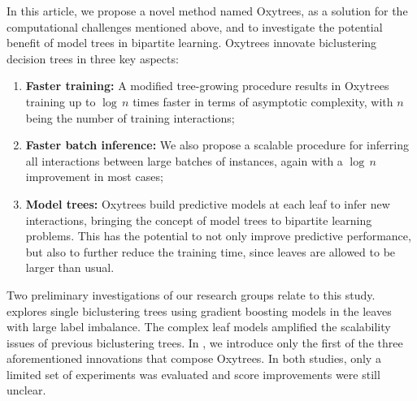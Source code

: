 \documentclass[sn-mathphys-num]{sn-jnl}%
\theoremstyle{thmstyleone}%
\theoremstyle{thmstyletwo}%
\theoremstyle{thmstylethree}%
\begin{document}
In this article, we propose a novel method named Oxytrees, as a solution for the computational challenges mentioned above, and to investigate the potential benefit of model trees in bipartite learning. Oxytrees innovate biclustering decision trees in three key aspects:
%
\begin{enumerate}
    \item \textbf{Faster training:} A modified tree-growing procedure results in Oxytrees training up to $\log\, n$ times faster in terms of asymptotic complexity, with $n$ being the number of training interactions;
    \item \textbf{Faster batch inference:} We also propose a scalable procedure for inferring all interactions between large batches of instances, again with a $\log\,n$ improvement in most cases;
    \item \textbf{Model trees:} Oxytrees build predictive models at each leaf to infer new interactions, bringing the concept of model trees to bipartite learning problems. This has the potential to not only improve predictive performance, but also to further reduce the training time, since leaves are allowed to be larger than usual.
\end{enumerate}

Two preliminary investigations of our research groups relate to this study. \cite{alves2022twostep} explores single biclustering trees using gradient boosting models in the leaves with large label imbalance. The complex leaf models amplified the scalability issues of previous biclustering trees.
In \cite{ilidio_fast_2024}, we introduce only the first of the three aforementioned innovations that compose Oxytrees. In both studies, only a limited set of experiments was evaluated and score improvements were still unclear.
\end{document}
